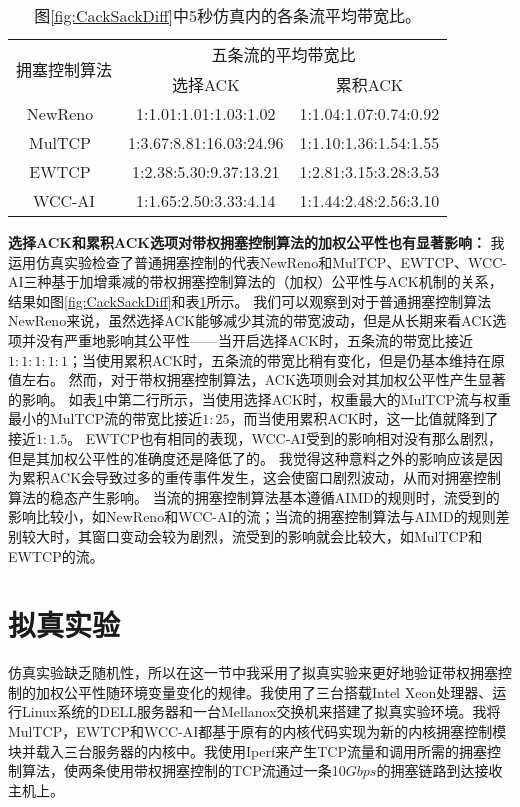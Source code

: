 \documentclass[winfonts]{njuthesis}
\begin{document}
\begin{table}[h]
	\caption{图\ref{fig:CackSackDiff}中5秒仿真内的各条流平均带宽比。}
	\label{tab:CackSackDiff}
	\centering
	\begin{tabular}{c|cc}
		\hline
		\multirow{2}{*}{拥塞控制算法} & \multicolumn{2}{c}{五条流的平均带宽比} \\
		\cline{2-3} & 选择ACK & 累积ACK \\
		\hline
		NewReno~\cite{Henderson2012NewReno} & 1:1.01:1.01:1.03:1.02 & 1:1.04:1.07:0.74:0.92 \\
		MulTCP~\cite{crowcroft1998differentiated} & 1:3.67:8.81:16.03:24.96 & 1:1.10:1.36:1.54:1.55 \\
		EWTCP~\cite{Honda2009EWTCP} & 1:2.38:5.30:9.37:13.21 & 1:2.81:3.15:3.28:3.53\\
		WCC-AI & 1:1.65:2.50:3.33:4.14 & 1:1.44:2.48:2.56:3.10\\
		\hline
	\end{tabular}
\end{table}

\textbf{选择ACK和累积ACK选项对带权拥塞控制算法的加权公平性也有显著影响：}
我运用仿真实验检查了普通拥塞控制的代表NewReno和MulTCP、EWTCP、WCC-AI三种基于加增乘减的带权拥塞控制算法的（加权）公平性与ACK机制的关系，结果如图\ref{fig:CackSackDiff}和表\ref{tab:CackSackDiff}所示。
我们可以观察到对于普通拥塞控制算法NewReno来说，虽然选择ACK能够减少其流的带宽波动，但是从长期来看ACK选项并没有严重地影响其公平性——当开启选择ACK时，五条流的带宽比接近$1:1:1:1:1$；当使用累积ACK时，五条流的带宽比稍有变化，但是仍基本维持在原值左右。
然而，对于带权拥塞控制算法，ACK选项则会对其加权公平性产生显著的影响。
如表\ref{tab:CackSackDiff}中第二行所示，当使用选择ACK时，权重最大的MulTCP流与权重最小的MulTCP流的带宽比接近$1:25$，而当使用累积ACK时，这一比值就降到了接近$1:1.5$。
EWTCP也有相同的表现，WCC-AI受到的影响相对没有那么剧烈，但是其加权公平性的准确度还是降低了的。
我觉得这种意料之外的影响应该是因为累积ACK会导致过多的重传事件发生\cite{Mathis1996SACK}，这会使窗口剧烈波动，从而对拥塞控制算法的稳态产生影响。
当流的拥塞控制算法基本遵循AIMD的规则时，流受到的影响比较小，如NewReno和WCC-AI的流；当流的拥塞控制算法与AIMD的规则差别较大时，其窗口变动会较为剧烈，流受到的影响就会比较大，如MulTCP和EWTCP的流。

\section{拟真实验}
\label{sec:emulation}

仿真实验缺乏随机性，所以在这一节中我采用了拟真实验来更好地验证带权拥塞控制的加权公平性随环境变量变化的规律。我使用了三台搭载Intel Xeon处理器、运行Linux系统的DELL服务器和一台Mellanox交换机来搭建了拟真实验环境。我将MulTCP，EWTCP和WCC-AI都基于原有的内核代码实现为新的内核拥塞控制模块并载入三台服务器的内核中。我使用Iperf\cite{iperf}来产生TCP流量和调用所需的拥塞控制算法，使两条使用带权拥塞控制的TCP流通过一条10$Gbps$的拥塞链路到达接收主机上。
\end{document}
